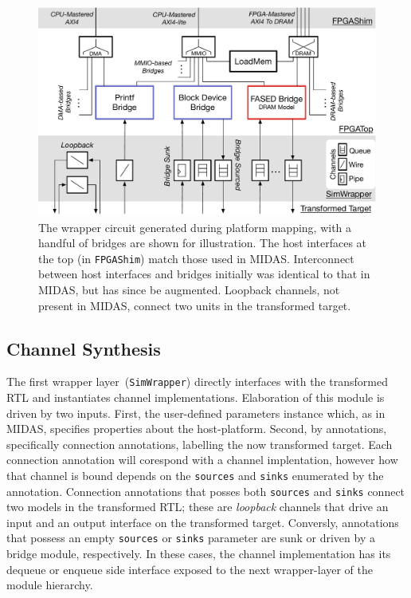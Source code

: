 \begin{figure}
  \centering
    \includegraphics[width=\columnwidth]{figures/sim-wrapper-layers.pdf}
    \caption{The wrapper circuit generated during platform mapping, with a handful of bridges are shown for
    illustration. The host interfaces at the top (in \texttt{FPGAShim}) match those used in MIDAS. Interconnect
    between host interfaces and bridges initially was identical to that in MIDAS, but has since be augmented.
    Loopback channels, not present in MIDAS, connect two units in the transformed target.
    }
  \label{fig:sim-wrapper-layers}
\end{figure}


\subsection{Channel Synthesis}
The first wrapper layer~(\texttt{SimWrapper}) directly interfaces with the transformed RTL and instantiates
channel implementations. Elaboration of this module is driven by two inputs. First, the user-defined parameters instance
which, as in MIDAS, specifies properties about the host-platform. Second, by
annotations, specifically connection annotations, labelling the now transformed target.
Each connection annotation will corespond with a channel implentation, however how that channel
is bound depends on the \texttt{sources} and \texttt{sinks} enumerated by the annotation.
Connection annotations that posses both \texttt{sources} and \texttt{sinks}
connect two models in the transformed RTL; these are \emph{loopback} channels
that drive an input and an output interface on the transformed target. Conversly,
annotations that possess an empty \texttt{sources} or \texttt{sinks} parameter
are sunk or driven by a bridge module, respectively. In these cases, the
channel implementation has its dequeue or enqueue side
interface exposed to the next wrapper-layer of the module hierarchy.

